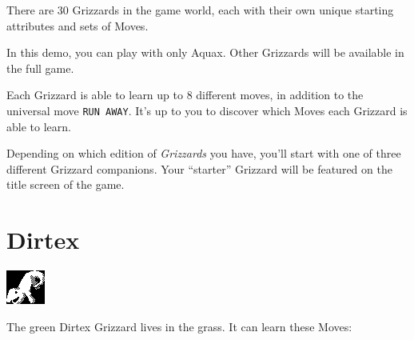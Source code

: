 \documentclass[10pt,twocolumn,openany,article]{memoir}
\begin{document}
\begin{description}
There are  30 Grizzards in  the game world,  each with their  own unique
starting attributes and sets of Moves.

\ifdefined\DEMO

In this  demo, you  can play  with only Aquax.  Other Grizzards  will be
available in the full game.

\fi

Each Grizzard is able  to learn up to 8 different  moves, in addition to
the universal move  \texttt{RUN AWAY}. It's up to you  to discover which
Moves each  Grizzard is  able to  learn.

\ifdefined\DEMO\else

Depending on which edition of  \textit{Grizzards} you have, you'll start
with  one  of  three  different Grizzard  companions.  Your  ``starter''
Grizzard will be featured on the title screen of the game.

\section{Dirtex}

\includegraphics[width=\columnwidth]{../Source/Banks/Bank00/Grizzard0-1.png}

The green Dirtex Grizzard lives in the grass. It can learn these Moves:


\end{description}
\end{document}

